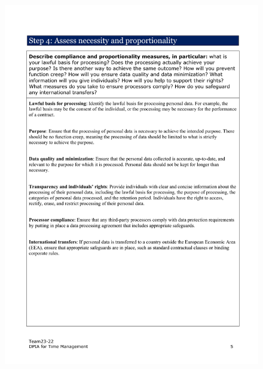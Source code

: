 \documentclass[a4paper]{article}
\begin{document}
\begin{figure}[H]
	\centering
	\includegraphics[width=1\textwidth]{./images/DPIA-Team23-22/DPIA-Team23-22_5.pdf}
	\label{Fig.DPIA_5}
\end{figure}
\end{document}
